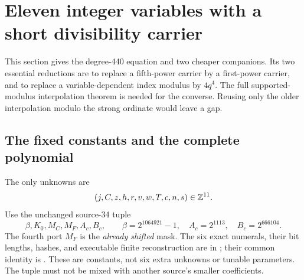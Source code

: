 \section{Eleven integer variables with a short divisibility carrier}
\label{sec:short-carrier}
This section gives the degree-440 equation and two cheaper companions.
Its two essential reductions are to replace a fifth-power carrier by
a first-power carrier, and to replace a variable-dependent index modulus
by $4q^4$. The full supported-modulus interpolation theorem is needed for
the converse. Reusing only the older interpolation modulo the strong
ordinate would leave a gap.

\subsection{The fixed constants and the complete polynomial}
The only unknowns are
\[
 (j,C,z,h,r,v,w,T,c,n,s)\in\mathbb Z^{11}.
\]
Use the unchanged source-34 tuple
\[
 \beta,K_0,M_C,M_F,A_c,B_c,
 \qquad \beta=2^{1064921}-1,\quad
 A_c=2^{1113},\quad B_c=2^{666104}.
\]
The fourth port $M_F$ is the \emph{already shifted} mask. The six exact
numerals, their bit lengths, hashes, and executable finite reconstruction
are in ; their common identity is
. These are constants, not six extra
unknowns or tunable parameters. The tuple must not be mixed with another
source's smaller coefficients.

